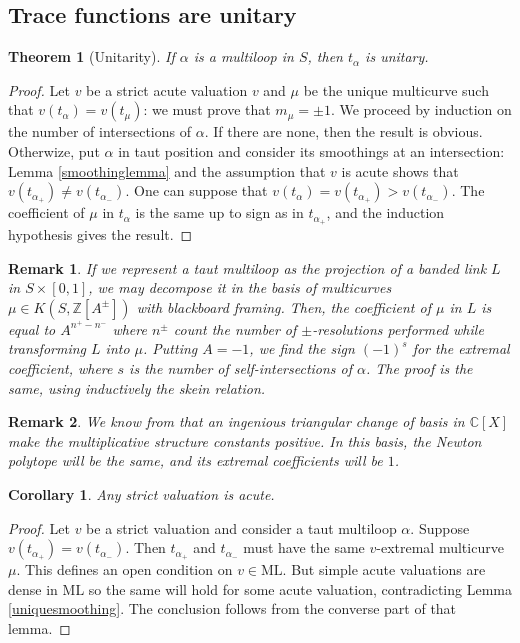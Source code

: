 \documentclass{amsart}
\newtheorem{theorem}{Theorem}
\newtheorem{corollary}{Corollary}
\newtheorem{remark}{Remark}
\newcommand{\C}{\mathbb{C}}
\newcommand{\Z}{\mathbb{Z}}
\newcommand{\ML}{\mathrm{ML}}
\begin{document}
\subsection{Trace functions are unitary}

\begin{theorem}[Unitarity]
If $\alpha$ is a multiloop in $S$, then $t_\alpha$ is unitary.
\end{theorem}
\begin{proof}
Let $v$ be a strict acute valuation $v$ and $\mu$ be the unique multicurve such that $v(t_\alpha)=v(t_{\mu})$: we must prove that $m_{\mu}=\pm 1$.
We proceed by induction on the number of intersections of $\alpha$. If there are none, then the result is obvious. Otherwize, put $\alpha$ in taut position and consider its smoothings at an intersection: Lemma \ref{smoothinglemma} and the assumption that $v$ is acute shows that $v(t_{\alpha_+})\ne v(t_{\alpha_-})$. One can suppose that $v(t_\alpha)=v(t_{\alpha_+})>v(t_{\alpha_-})$. The coefficient of $\mu$ in $t_\alpha$ is the same up to sign as in $t_{\alpha_+}$, and the induction hypothesis gives the result. \end{proof}

\begin{remark}
If we represent a taut multiloop as the projection of a banded link $L$ in $S\times[0,1]$, we may decompose it in the basis of multicurves $\mu\in K(S,\Z[A^{\pm}])$ with blackboard framing. 
Then, the coefficient of $\mu$ in $L$ is equal to $A^{n^+-n^-}$ where $n^{\pm}$ count the number of $\pm$-resolutions performed while transforming $L$ into $\mu$.
%
Putting $A=-1$, we find the sign $(-1)^s$ for the extremal coefficient, where $s$ is the number of self-intersections of $\alpha$. The proof is the same, using inductively the skein relation.
\end{remark}

\begin{remark}
We know from \cite{Dylan_Positive_2014} that an ingenious triangular change of basis in $\C[X]$ make the multiplicative structure constants positive. In this basis, the Newton polytope will be the same, and its extremal coefficients will be $1$.
\end{remark}

\begin{corollary}\label{strictimpliesacute}
Any strict valuation is acute. 
\end{corollary}
\begin{proof}
Let $v$ be a strict valuation and consider a taut multiloop $\alpha$. Suppose $v(t_{\alpha_+})=v(t_{\alpha_-})$. Then $t_{\alpha_+}$ and $t_{\alpha_-}$ must have the same $v$-extremal multicurve $\mu$. This defines an open condition on $v\in \ML$. But simple acute valuations are dense in $\ML$ so the same will hold for some acute valuation, contradicting Lemma \ref{uniquesmoothing}. The conclusion follows from the converse part of that lemma.
\end{proof}
\end{document}
